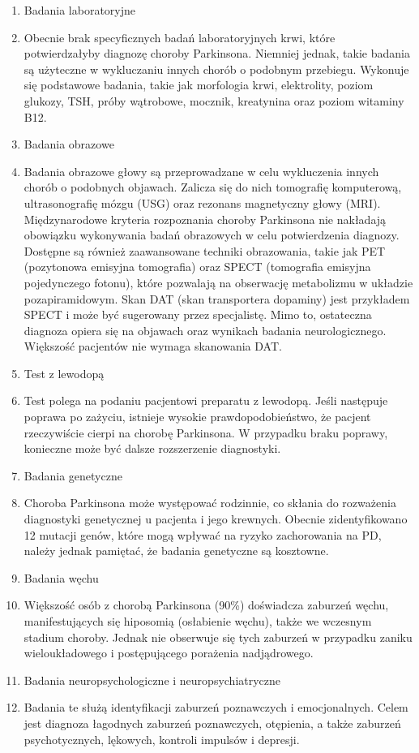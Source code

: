 \renewcommand{\labelenumi}{\alph{enumi})}
\begin{enumerate}
	\item Badania laboratoryjne
	\item[] Obecnie brak specyficznych badań laboratoryjnych krwi, które potwierdzałyby diagnozę choroby Parkinsona.
Niemniej jednak, takie badania są użyteczne w wykluczaniu innych chorób o podobnym przebiegu.
Wykonuje się podstawowe badania, takie jak morfologia krwi, elektrolity, poziom glukozy, TSH, próby wątrobowe, mocznik, kreatynina oraz poziom witaminy B12.

	\item Badania obrazowe
	\item[] Badania obrazowe głowy są przeprowadzane w celu wykluczenia innych chorób o podobnych objawach.
Zalicza się do nich tomografię komputerową, ultrasonografię mózgu (USG) oraz rezonans magnetyczny głowy (MRI).
Międzynarodowe kryteria rozpoznania choroby Parkinsona nie nakładają obowiązku wykonywania badań obrazowych w celu potwierdzenia diagnozy.
Dostępne są również zaawansowane techniki obrazowania, takie jak PET (pozytonowa emisyjna tomografia) oraz SPECT (tomografia emisyjna pojedynczego fotonu), które pozwalają na obserwację metabolizmu w układzie pozapiramidowym. Skan DAT (skan transportera dopaminy) jest przykładem SPECT i może być sugerowany przez specjalistę.
Mimo to, ostateczna diagnoza opiera się na objawach oraz wynikach badania neurologicznego. Większość pacjentów nie wymaga skanowania DAT.

	\item Test z lewodopą
	\item[]Test polega na podaniu pacjentowi  preparatu z lewodopą.
Jeśli następuje poprawa po zażyciu, istnieje wysokie prawdopodobieństwo, że pacjent rzeczywiście cierpi na chorobę Parkinsona.
W przypadku braku poprawy, konieczne może być dalsze rozszerzenie diagnostyki.

	\item Badania genetyczne
	\item[] Choroba Parkinsona może występować rodzinnie, co skłania do rozważenia diagnostyki genetycznej u pacjenta i jego krewnych.
Obecnie zidentyfikowano 12 mutacji genów, które mogą wpływać na ryzyko zachorowania na PD, należy jednak pamiętać, że badania genetyczne są kosztowne.

	\item Badania węchu
	\item[] Większość osób z chorobą Parkinsona (90\%) doświadcza zaburzeń węchu, manifestujących się hiposomią (osłabienie węchu), także we wczesnym stadium choroby.
Jednak nie obserwuje się tych zaburzeń w przypadku zaniku wieloukładowego i postępującego porażenia nadjądrowego.

	\item Badania neuropsychologiczne i neuropsychiatryczne
	\item[] Badania te służą identyfikacji zaburzeń poznawczych i emocjonalnych.
Celem jest diagnoza łagodnych zaburzeń poznawczych, otępienia, a także zaburzeń psychotycznych, lękowych, kontroli impulsów i depresji.
\end{enumerate}

